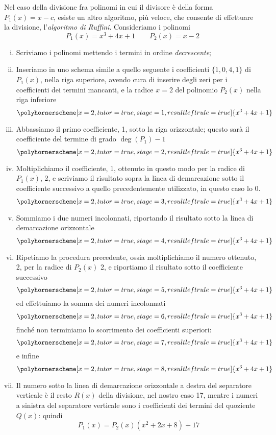 \begin{example}
    Nel caso della divisione fra polinomi in cui il divisore è della forma $P_1(x) = x-c$, esiste un altro algoritmo, più veloce, che consente di effettuare la divisione, l'\emph{algoritmo di Ruffini}. Consideriamo i polinomi
    \[
    P_1(x) = x^3+4x+1 \qquad P_2(x) = x-2
    \]
    \begin{enumerate}[(i)]
        \item Scriviamo i polinomi mettendo i termini in ordine \emph{decrescente};
        \item Inseriamo in uno schema simile a quello seguente i coefficienti $\{1, 0, 4, 1\}$ di $P_1(x)$, nella riga superiore, avendo cura di inserire degli zeri per i coefficienti dei termini mancanti, e la radice $x=2$ del polinomio $P_2(x)$ nella riga inferiore
        \[
        \polyhornerscheme[x=2, tutor=true, stage=1, resultleftrule=true]{x^3+4x+1}
        \]
        \item Abbassiamo il primo coefficiente, 1, sotto la riga orizzontale; questo sarà il coefficiente del termine di grado $\deg(P_1)-1$
        \[
        \polyhornerscheme[x=2, tutor=true, stage=2, resultleftrule=true]{x^3+4x+1}
        \]
        \item Moltiplichiamo il coefficiente, 1, ottenuto in questo modo per la radice di $P_1(x)$, 2, e scriviamo il risultato sopra la linea di demarcazione sotto il coefficiente successivo a quello precedentemente utilizzato, in questo caso lo 0.  
        \[
        \polyhornerscheme[x=2, tutor=true, stage=3, resultleftrule=true]{x^3+4x+1}
        \]
        \item Sommiamo i due numeri incolonnati, riportando il risultato sotto la linea di demarcazione orizzontale
        \[
        \polyhornerscheme[x=2, tutor=true, stage=4, resultleftrule=true]{x^3+4x+1}
        \]
        \item Ripetiamo la procedura precedente, ossia moltiplichiamo il numero ottenuto, 2,  per la radice di $P_2(x)$ 2, e riportiamo il risultato sotto il coefficiente successivo
        \[
        \polyhornerscheme[x=2, tutor=true, stage=5, resultleftrule=true]{x^3+4x+1}
        \]
        ed effettuiamo la somma dei numeri incolonnati
        \[
        \polyhornerscheme[x=2, tutor=true, stage=6, resultleftrule=true]{x^3+4x+1}
        \]
        finché non terminiamo lo scorrimento dei coefficienti superiori:
        \[
        \polyhornerscheme[x=2, tutor=true, stage=7, resultleftrule=true]{x^3+4x+1}
        \]
        e infine
        \[
        \polyhornerscheme[x=2, tutor=true, stage=8, resultleftrule=true]{x^3+4x+1}
        \]
        \item Il numero sotto la linea di demarcazione orizzontale a destra del separatore verticale è il resto $R(x)$ della divisione, nel nostro caso 17, mentre i numeri a sinistra del separatore verticale sono i coefficienti dei termini del quoziente $Q(x)$: quindi
        \[
        P_1(x) = P_2(x)(x^2 + 2x+8)+17
        \]
    \end{enumerate}
\end{example}
